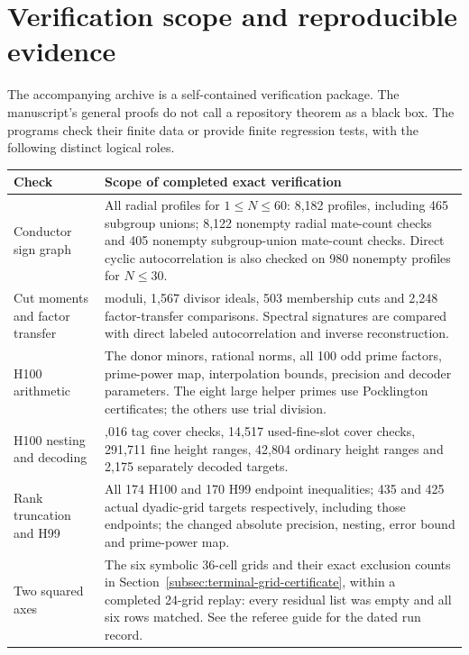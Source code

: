 \section{Verification scope and reproducible evidence}\label{v2:app:verification}
The accompanying archive is a self-contained verification package. The
manuscript's general proofs do not call a repository theorem as a black box.
The programs check their finite data or provide finite regression tests,
with the following distinct logical roles.

\begin{center}\small
\begin{tabular}{@{}>{\raggedright\arraybackslash}p{.27\linewidth}>{\raggedright\arraybackslash}p{.64\linewidth}@{}}\toprule
Check & Scope of completed exact verification\\\midrule
Conductor sign graph &
All radial profiles for $1\le N\le60$: 8,182 profiles, including
465 subgroup unions; 8,122 nonempty radial mate-count checks and
405 nonempty subgroup-union mate-count checks. Direct cyclic
autocorrelation is also checked on 980 nonempty profiles for $N\le30$.\\
Cut moments and factor transfer &
85 moduli, 1,567 divisor ideals, 503 membership cuts and 2,248
factor-transfer comparisons. Spectral signatures are compared with
direct labeled autocorrelation and inverse reconstruction.\\
H100 arithmetic &
The donor minors, rational norms, all 100 odd prime factors, prime-power
map, interpolation bounds, precision and decoder parameters. The eight
large helper primes use Pocklington certificates; the others use trial
division.\\
H100 nesting and decoding &
902,016 tag cover checks, 14,517 used-fine-slot cover checks,
291,711 fine height ranges, 42,804 ordinary height ranges and 2,175
separately decoded targets.\\
Rank truncation and H99 &
All 174 H100 and 170 H99 endpoint inequalities; 435 and 425
actual dyadic-grid targets respectively, including those endpoints;
the changed absolute precision,
nesting, error bound and prime-power map.\\
Two squared axes &
The six symbolic 36-cell grids and their exact exclusion counts in
Section~\ref{subsec:terminal-grid-certificate}, within a completed 24-grid replay: every residual list was empty and
all six rows matched. See the referee guide for the dated run record.\\\bottomrule
\end{tabular}
\end{center}

